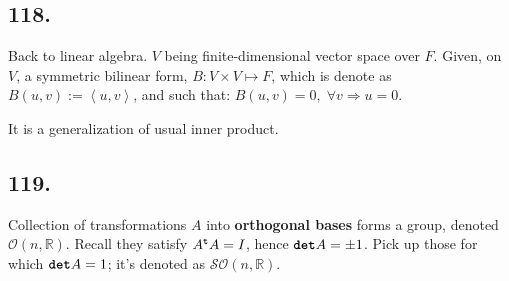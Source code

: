 \documentclass[12pt]{article}
\newcommand\X\times%
\newcommand\Ev\forall%
\newcommand{\Ip}{\Rightarrow} %
\newcommand{\Ab}[1]{ \left\langle #1 \right\rangle } %
\newcommand{\BF}[1]{ \mathbb{#1} }%
\newcommand{\CF}[1]{ \mathcal{#1} }%
\newcommand{\Ss}[1]{\textsf{\textbf{#1}}}%
\newcommand{\Tw}[1]{\texttt{\textbf{#1}}}%
\begin{document}
\subsection*{118.} Back to linear algebra. 
\(V\) being finite-dimensional vector space over \(F\). 
Given, on \(V\), a symmetric bilinear form, \(B: V \X V \mapsto F\), which is denote as \(B(u,v) := \Ab{u,v}\), 
and such that: \(B(u,v) =0,\; \Ev v \Ip u=0\). \par
It is a generalization of usual inner product. 

\subsection*{119.} Collection of transformations \(A\) into \Ss{orthogonal bases} forms a group, denoted \(\CF{O}(n,\BF R)\). 
Recall they satisfy \(A^\Tw{t} A = I\), hence \(\Tw{det} A = \pm 1\). 
Pick up those for which \(\Tw{det} A = 1\); it's denoted as \(\CF{SO}(n,\BF R)\).
\end{document}
